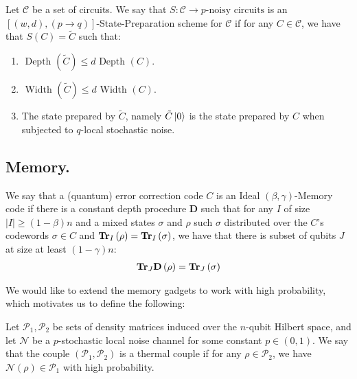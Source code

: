 \documentclass[manuscript,screen,review]{acmart}
\begin{document}
{\begin{definition} Let $\mathcal{C}$ be a set of circuits. We say that $S : \mathcal{C} \rightarrow p\text{-noisy circuits} $ is an $\left[ (w,d), (p \rightarrow q) \right]$-State-Preparation scheme for $\mathcal{C}$ if for any $C \in \mathcal{C}$, we have that $S(C) = \tilde{C}$ such that:
  \begin{enumerate}
    \item $\text{ Depth } (\tilde{C} ) \le d\text{ Depth } (C )$. 
    \item $\text{ Width } (\tilde{C} ) \le d\text{ Width } (C )$. 
    \item The state prepared by $\tilde{C}$, namely $\tilde{C}\ket{0}$ is the state prepared by $C$ when subjected to $q$-local stochastic noise. 
  \end{enumerate}  
  \end{definition}


 \subsection{Memory.} 
 \newcommand*{\DD}{\mathbf{D} }
 \begin{definition}
   We say that a (quantum) error correction code $C$ is an Ideal $(\beta,\gamma)$-Memory code if there is a constant depth procedure $\DD$ such that for any $I$ of size $|I| \ge (1 - \beta) n$ and a mixed states $\sigma$ and $\rho$ such $\sigma$ distributed over the $C$'s codewords $\sigma \in C$ and $\mathbf{Tr}_{I}\left(\rho\right) = \mathbf{Tr}_{I}\left(\sigma\right)$, we have that there is subset of qubits $J$ at size at least $(1-\gamma)n$:
   \begin{equation*}
     \begin{split}
        \Tr_{J} \DD \left(\rho\right) = \Tr_{J}\left(\sigma\right) 
     \end{split}
   \end{equation*}

 \end{definition}
We would like to extend the memory gadgets to work with high probability, which motivates us to define the following:
\newcommand*{\Po}{\mathcal{P}_{1}}
\newcommand*{\Pt}{\mathcal{P}_{2}}
\newcommand*{\Nn}{\mathcal{N}}
\begin{definition}[ $\left(\Po,\Pt \right)$- thermal couple. ]
Let $\Po,\Pt$ be sets of density matrices induced over the $n$-qubit Hilbert space, and let $\Nn$ be a $p$-stochastic local noise channel for some constant $p \in (0,1)$. We say that the couple $\left(\Po,\Pt \right)$ is a thermal couple if for any $\rho \in \Pt$, we have $\Nn(\rho) \in \Po$ with high probability.
\end{definition}

}
\end{document}
